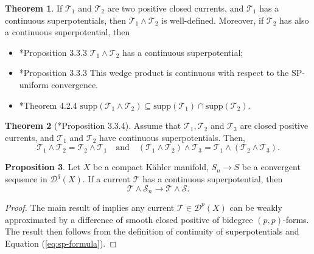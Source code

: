 \documentclass[11pt]{amsart}
\theoremstyle{definition}
\newtheorem{theorem}{Theorem}[section]
\newtheorem{proposition}[theorem]{Proposition}
\newcommand{\lto}{\longrightarrow}
\newcommand{\sD}{\mathscr{D}}
\newcommand{\sT}{\mathscr{T}}
\newcommand{\sS}{\mathscr{S}}
\newcommand{\supp}[1]{{\mathrm{supp}(#1)}}
\begin{document}
\begin{theorem}\label{thm:wedge-cont-pot}
 If $\sT_1$ and $\sT_2$ are two positive closed currents, and $\sT_1$ has a continuous superpotentials, then $\sT_1 \wedge \sT_2$ is well-defined. Moreover, if $\sT_2$ has also a continuous superpotential, then 
 \begin{itemize}
     \item [(a)] \cite{Dinh-Sibony:Kahler}*{Proposition 3.3.3} $\sT_1 \wedge \sT_2$ has a continuous superpotential; 
     \item [(b)] \cite{Dinh-Sibony:Kahler}*{Proposition 3.3.3} This wedge product is continuous with respect to the SP-uniform convergence. 
     \item [(c)] \cite{Dinh-Sibony:superpot}*{Theorem 4.2.4} $\supp{\sT_1 \wedge \sT_2} \subseteq \supp{\sT_1} \cap \supp{ \sT_2}.$
 \end{itemize}
 
 
\end{theorem}
\begin{theorem}[\cite{Dinh-Sibony:Kahler}*{Proposition 3.3.4}]\label{thm:DS-commut-asso}
    Assume that $\sT_1, \sT_2$ and $\sT_3$ are closed positive currents, and $\sT_1$ and $\sT_2$ have continuous superpotentials. Then, 
$$
\sT_1 \wedge \sT_2 = \sT_2 \wedge \sT_1 \quad \text{and} \quad (\sT_1 \wedge \sT_2) \wedge \sT_3 = \sT_1 \wedge (\sT_2 \wedge \sT_3). 
$$
\end{theorem}
\begin{proposition}\label{prop:slicing-CSP}
   Let $X$ be a compact K\"ahler manifold, $S_n \lto S$ be a convergent sequence in $\sD^q(X).$ If a current $\sT$ has a continuous superpotential, then 
    $$
    \sT \wedge \sS_n \lto \sT \wedge \sS. 
    $$
\end{proposition}
\begin{proof}
    The main result of \cite{Dinh-Sibony-Reg} implies any current $\sT \in \sD^p(X)$ can be weakly approximated by a difference of smooth closed positive of bidegree $(p,p)$-forms. The result then follows from the definition of continuity of superpotentials and Equation (\ref{eq:sp-formula}). 
\end{proof}
\end{document}
